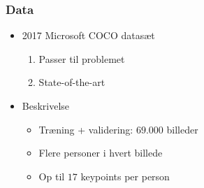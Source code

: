\documentclass{beamer}
\begin{document}
\begin{frame}
    \frametitle{Data}
    \begin{minipage}{0.5\textwidth}
        \begin{itemize}
            \item<2-> 2017 Microsoft COCO datasæt
            \begin{enumerate}
                \item Passer til problemet
                \item State-of-the-art
            \end{enumerate}
            \item<3-> Beskrivelse
            \begin{itemize}
                \item Træning + validering: $69$.000 billeder
                \item Flere personer i hvert billede
                \item Op til $17$ keypoints per person
            \end{itemize}
        \end{itemize}
    \end{minipage}
    \begin{minipage}{0.45\textwidth}
    \end{minipage}
\end{frame}
\end{document}
